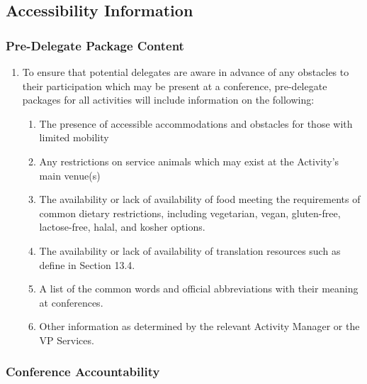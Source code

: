 \subsection{Accessibility Information}
\label{accessibility-information}

\subsubsection{Pre-Delegate Package Content}
\label{pre-delegate-package-content}

\begin{enumerate}
 \item
  To ensure that potential delegates are aware in advance of any obstacles to their participation which may be present at a conference, pre-delegate packages for all activities will include information on the following:

  \begin{enumerate}
   \item
    The presence of accessible accommodations and obstacles for those with limited mobility
   \item
    Any restrictions on service animals which may exist at the Activity's main venue(s)
   \item
    The availability or lack of availability of food meeting the requirements of common dietary restrictions, including vegetarian, vegan, gluten-free, lactose-free, halal, and kosher options.
   \item
    The availability or lack of availability of translation resources such as define in Section 13.4.
   \item
    A list of the common words and official abbreviations with their meaning at conferences.
   \item
    Other information as determined by the relevant Activity Manager or the VP Services.
  \end{enumerate}
\end{enumerate}

\subsubsection{Conference Accountability}
\label{conference-accountability}

